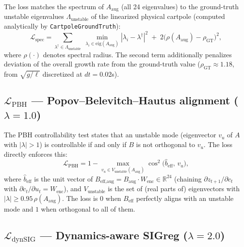 \documentclass[11pt]{article}
\newcommand{\R}{\mathbb{R}}
\newcommand{\loss}[1]{\mathcal{L}_{\text{#1}}}
\begin{document}
The loss matches the spectrum of $A_{\text{aug}}$ (all 24 eigenvalues) to the
ground-truth unstable eigenvalues $\Lambda_{\text{unstable}}$ of the
linearized physical cartpole (computed analytically by
\texttt{CartpoleGroundTruth}):
\begin{equation}
\loss{spec} = \sum_{\lambda^\dagger \in \Lambda_{\text{unstable}}}
\ \min_{\lambda_i \in \text{eig}(A_{\text{aug}})} |\lambda_i - \lambda^\dagger|^2
\;+\; 2\big(\rho(A_{\text{aug}}) - \rho_{\text{GT}}\big)^2,
\end{equation}
where $\rho(\cdot)$ denotes spectral radius. The second term additionally
penalizes deviation of the overall growth rate from the ground-truth value
($\rho_{\text{GT}} \approx 1.18$, from $\sqrt{g/\ell}$ discretized at $dt=0.02$s).

\subsection{$\loss{PBH}$ --- Popov--Belevitch--Hautus alignment \quad ($\lambda = 1.0$)}

The PBH controllability test states that an unstable mode (eigenvector $v_u$ of
$A$ with $|\lambda| > 1$) is controllable if and only if $B$ is not orthogonal
to $v_u$. The loss directly enforces this:
\begin{equation}
\loss{PBH} = 1 - \max_{v_u \in V_{\text{unstable}}(A_{\text{aug}})} \cos^2\!\big(\hat b_{\text{eff}},\, v_u\big),
\end{equation}
where $\hat b_{\text{eff}}$ is the unit vector of
$B_{\text{eff,aug}} = B_{\text{aug}} \cdot W_{\text{enc}} \in \R^{24}$
(chaining $\partial z_{t+1}/\partial c_t$ with $\partial c_t/\partial u_t = W_{\text{enc}}$),
and $V_{\text{unstable}}$ is the set of (real parts of) eigenvectors with
$|\lambda| \geq 0.95\,\rho(A_{\text{aug}})$. The loss is $0$ when $B_{\text{eff}}$
perfectly aligns with an unstable mode and $1$ when orthogonal to all of them.

\subsection{$\loss{dynSIG}$ --- Dynamics-aware SIGreg \quad ($\lambda = 2.0$)}
\end{document}

